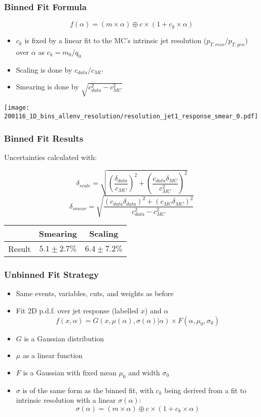 \documentclass{beamer}
\begin{document}
\begin{frame}
  \frametitle{Binned Fit Formula}

  \[
  f(\alpha) = (m \times \alpha) \oplus c \times (1 + c_k \times \alpha)
  \]

  \begin{itemize}
  \item $c_k$ is fixed by a linear fit to the MC's intrinsic jet resolution ($p_{T, reco}/p_{T, gen}$) over $\alpha$ as $c_k = m_0/q_0$
  \item Scaling is done by $c_{data}/c_{MC}$
  \item Smearing is done by $\sqrt{c_{data}^2 - c_{MC}^2}$
  \end{itemize}

  \centering
  \texttt{[image: 200116\_1D\_bins\_allenv\_resolution/resolution\_jet1\_response\_smear\_0.pdf]}

\end{frame}


\begin{frame}
  \frametitle{Binned Fit Results}

  Uncertainties calculated with:

  \[
  \delta_{scale} = \sqrt{\left(\frac{\delta_{data}}{c_{MC}}\right)^2 +
    \left(\frac{c_{data}\delta_{MC}}{c_{MC}^2}\right)^2}
  \]
  \[
  \delta_{smear} = \sqrt{\frac{(c_{data}\delta_{data})^2 +
      (c_{MC}\delta_{MC})^2}{c_{data}^2 - c_{MC}^2}}
  \]

  \vfill
  \centering
  \begin{tabular}{l|c|c|}
    & Smearing & Scaling \\
    \hline
    Result & $5.1 \pm 2.7 \%$ & $6.4 \pm 7.2 \%$ \\
    \hline
  \end{tabular}

\end{frame}


\begin{frame}
  \frametitle{Unbinned Fit Strategy}

  \begin{itemize}
  \item Same events, variables, cuts, and weights as before
  \item Fit 2D p.d.f. over jet response (labelled $x$) and $\alpha$
  \[
  f(x, \alpha) =
  G(x, \mu(\alpha), \sigma(\alpha)|\alpha)
  \times
  F(\alpha, \mu_0, \sigma_0)
  \]
  \item $G$ is a Gaussian distribution
  \item $\mu$ as a linear function
  \item $F$ is a Gaussian with fixed mean $\mu_0$ and width $\sigma_0$
  \item $\sigma$ is of the same form as the binned fit,
    with $c_k$ being derived from a fit to
    intrinsic resolution with a linear $\sigma(\alpha)$:
  \[
  \sigma(\alpha) = (m \times \alpha) \oplus c \times (1 + c_k \times \alpha)
  \]
  \end{itemize}


\end{frame}
\end{document}
